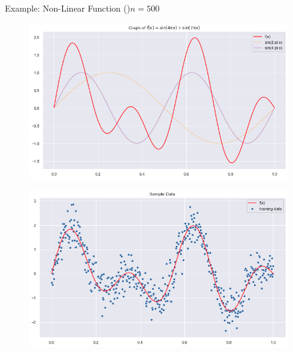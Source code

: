 \documentclass[10pt]{beamer}
\begin{document}
\begin{frame}{Example: Non-Linear Function (\cite{gaussian_process_reg_2019})}{$n=500$}
\begin{center}
\begin{figure}
\includegraphics[scale=0.25]{images/f_example2.png} 
\end{figure}
\end{center}
\begin{center}
\begin{figure}
\includegraphics[scale=0.25]{images/raw_data_example2.png} 
\end{figure}
\end{center}
\end{frame}
\end{document}
